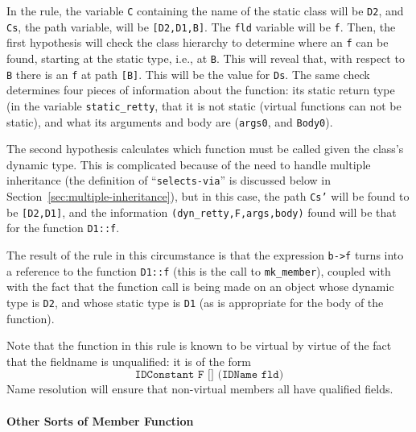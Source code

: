 \documentclass[11pt]{article}
\begin{document}
In the rule, the variable \texttt{C} containing the name of the static
class will be \texttt{D2}, and \texttt{Cs}, the path variable, will be
\texttt{[D2,D1,B]}.  The \texttt{fld} variable will be \texttt{f}.
Then, the first hypothesis will check the class hierarchy to determine
where an \texttt{f} can be found, starting at the static type, i.e.,
at \texttt{B}.  This will reveal that, with respect to \texttt{B}
there is an \texttt{f} at path \texttt{[B]}.  This will be the value
for \texttt{Ds}.  The same check determines four pieces of information
about the function: its static return type (in the variable
\texttt{static_retty}, that it is not static (virtual functions can
not be static), and what its arguments and body are (\texttt{args0},
and \texttt{Body0}).

The second hypothesis calculates which function must be called given
the class's dynamic type.  This is complicated because of the need to
handle multiple inheritance (the definition of
``\texttt{selects-via}'' is discussed below in
Section~\ref{sec:multiple-inheritance}), but in this case, the path
\texttt{Cs'} will be found to be \texttt{[D2,D1]}, and the information
\texttt{(dyn_retty,F,args,body)} found will be that for the function
\texttt{D1::f}.

The result of the rule in this circumstance is that the expression
\texttt{b->f} turns into a reference to the function \texttt{D1::f}
(this is the call to \texttt{mk_member}), coupled with with the fact
that the function call is being made on an object whose dynamic type
is \texttt{D2}, and whose static type is \texttt{D1} (as is
appropriate for the body of the function).

Note that the function in this rule is known to be virtual by virtue
of the fact that the fieldname is unqualified: it is of the form
\[
\texttt{IDConstant~F~[]~(IDName~fld)}
\]
Name resolution will ensure that non-virtual members all have
qualified fields.

\paragraph{Other Sorts of Member Function}
\end{document}
